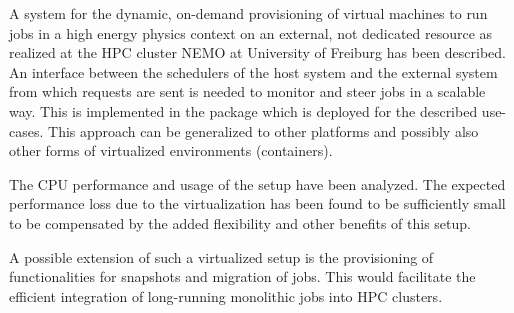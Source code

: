 A system for the dynamic, on-demand provisioning of virtual machines to run jobs
in a high energy physics context on an external, not dedicated resource as
realized at the HPC cluster NEMO at University of Freiburg has been
described. An interface between the schedulers of the
host system and the external system from which requests are sent is needed to
monitor and steer jobs in a scalable way. This is implemented in the \Roced package
which is deployed for the described use-cases.
This approach can be generalized to other platforms and possibly also other
forms of virtualized environments (containers).

The CPU performance and usage of the setup have been analyzed.
The expected performance loss due to the virtualization has been found to be
sufficiently small to be compensated by the added flexibility and other benefits
of this setup.

A possible extension of such a virtualized setup is the provisioning of functionalities
for snapshots and migration of jobs. This would facilitate the efficient integration of
long-running monolithic jobs into HPC clusters.



